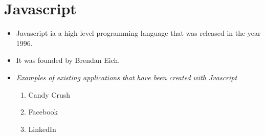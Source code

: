 \documentclass{article}
\begin{document}
	\section{Javascript}
	\begin{itemize}
		\item Javascript ia a high level programming language that was released in the year 1996.
		\item It was founded by Brendan Eich.
		\item \textit{Examples of existing applications that have been created with Jvascript}
		\begin{enumerate}
			\item Candy Crush
			\item Facebook
			\item LinkedIn
		\end{enumerate}
	\end{itemize}
\end{document}
